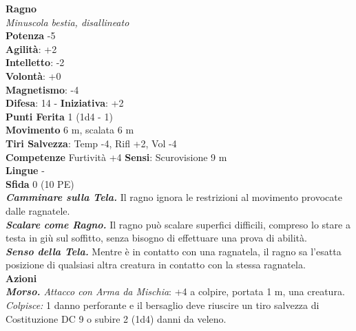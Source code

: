 \begin{multicols}{2}
\medskip\textbf{Ragno}\\
\emph{Minuscola bestia, disallineato}\\
\textbf{Potenza} -5\\
\textbf{Agilità}: +2\\
\textbf{Intelletto}: -2\\
\textbf{Volontà}: +0\\
\textbf{Magnetismo}: -4\\
\textbf{Difesa}: 14 - \textbf{Iniziativa}: +2\\
\textbf{Punti Ferita} 1 (1d4 - 1)\\
\textbf{Movimento} 6 m, scalata 6 m\\
\textbf{Tiri Salvezza}: Temp -4, Rifl +2, Vol -4 \\
\textbf{Competenze} Furtività +4
\textbf{Sensi}: Scurovisione 9 m\\
\textbf{Lingue} -\\
\textbf{Sfida} 0 (10 PE)\smallskip\\

\emph{\textbf{Camminare sulla Tela.}} Il ragno ignora le restrizioni al movimento provocate dalle ragnatele.\\

\emph{\textbf{Scalare come Ragno.}} Il ragno può scalare superfici difficili, compreso lo stare a testa in giù sul soffitto, senza bisogno di effettuare una prova di abilità.\\

\emph{\textbf{Senso della Tela.}} Mentre è in contatto con una ragnatela, il ragno sa l'esatta posizione di qualsiasi altra creatura in contatto con la stessa ragnatela.\\

\smallskip\textbf{Azioni}\\

\emph{\textbf{Morso.} Attacco con Arma da Mischia}: +4 a colpire, portata 1 m, una creatura.\\

\emph{Colpisce:} 1 danno perforante e il bersaglio deve riuscire un tiro salvezza di Costituzione DC 9 o subire 2 (1d4) danni da veleno.\\



\end{multicols}
